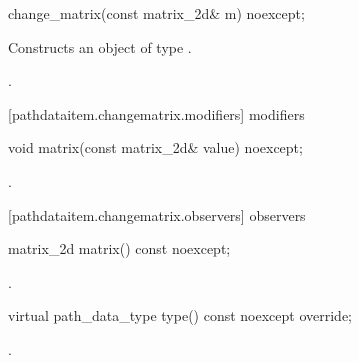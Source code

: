 \begin{itemdecl}
    change_matrix(const matrix_2d& m) noexcept;
\end{itemdecl}
\begin{itemdescr}
	\pnum
	\effects
	Constructs an object of type .
	
	\pnum
	\postconditions
	.
\end{itemdescr}

 [pathdataitem.changematrix.modifiers]{ modifiers}

\begin{itemdecl}
    void matrix(const matrix_2d& value) noexcept;
\end{itemdecl}
\begin{itemdescr}
	\pnum
	\postconditions
	.
	
\end{itemdescr}

 [pathdataitem.changematrix.observers]{ observers}

\begin{itemdecl}
    matrix_2d matrix() const noexcept;
\end{itemdecl}
\begin{itemdescr}
	\pnum
	\returns
	.

\end{itemdescr}

\begin{itemdecl}
    virtual path_data_type type() const noexcept override;
\end{itemdecl}
\begin{itemdescr}
	\pnum
	\returns
	.

\end{itemdescr}
